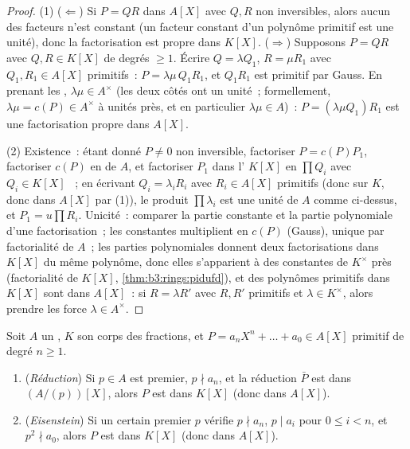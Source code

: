 \begin{proof}
(1) ($\Leftarrow$) Si $P = QR$ dans $A[X]$ avec $Q, R$ non
inversibles, alors aucun des facteurs n'est constant (un facteur
constant d'un polynôme primitif est une unité), donc la
factorisation est propre dans $K[X]$. ($\Rightarrow$) Supposons
$P = QR$ avec $Q, R \in K[X]$ de degrés $\geq 1$. Écrire $Q =
\lambda Q_1$, $R = \mu R_1$ avec $Q_1, R_1 \in A[X]$
primitifs~: $P = \lambda\mu\, Q_1R_1$, et $Q_1R_1$ est primitif
par Gauss. En prenant les , $\lambda\mu \in A^\times$
(les deux côtés ont un  unité~; formellement, $\lambda\mu
= c(P) \in A^\times$ à unités près, et en particulier $\lambda
\mu \in A$)~: $P = (\lambda\mu Q_1) R_1$ est une factorisation
propre dans $A[X]$.

(2) Existence~: étant donné $P \neq 0$ non inversible, factoriser
$P = c(P)P_1$, factoriser $c(P)$ en  de $A$, et
factoriser $P_1$ dans l' $K[X]$ en $\prod Q_i$ avec $Q_i \in
K[X]$ ~; en écrivant $Q_i = \lambda_i R_i$ avec
$R_i \in A[X]$ primitifs (donc  sur $K$, donc dans
$A[X]$ par (1)), le produit $\prod \lambda_i$ est une unité de
$A$ comme ci-dessus, et $P_1 = u\prod R_i$. Unicité~: comparer
la partie constante et la partie polynomiale d'une
factorisation~; les constantes multiplient en $c(P)$ (Gauss),
unique par factorialité de $A$~; les parties polynomiales
donnent deux factorisations dans $K[X]$ du même polynôme, donc
elles s'apparient à des constantes de $K^\times$ près
(factorialité de $K[X]$, \cref{thm:b3:rings:pidufd}), et des
polynômes primitifs  dans $K[X]$ sont  dans
$A[X]$~: si $R = \lambda R'$ avec $R, R'$ primitifs et $\lambda
\in K^\times$, alors prendre les  force $\lambda \in
A^\times$.
\end{proof}

\begin{theorem}\label{thm:b3:rings:criteria}
Soit $A$ un , $K$ son corps des fractions, et $P = a_nX^n +
\dots + a_0 \in A[X]$ primitif de degré $n \geq 1$.
\begin{enumerate}
  \item (\emph{Réduction}) Si $p \in A$ est premier, $p \nmid
        a_n$, et la réduction $\bar P$ est  dans
        $(A/(p))[X]$, alors $P$ est  dans $K[X]$
        (donc dans $A[X]$).
  \item (\emph{Eisenstein}) Si un
        certain premier $p$ vérifie $p \nmid a_n$, $p \mid a_i$
        pour $0 \leq i < n$, et $p^2 \nmid a_0$, alors $P$ est
         dans $K[X]$ (donc dans $A[X]$).
\end{enumerate}
\end{theorem}


